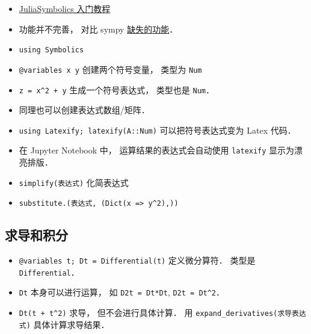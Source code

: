 
\begin{itemize}
\item \href{https://symbolics.juliasymbolics.org/dev/tutorials/symbolic_functions/}{JuliaSymbolics 入门教程}
\item 功能并不完善， 对比 sympy \href{https://github.com/JuliaSymbolics/Symbolics.jl/issues/59}{缺失的功能}．
\item \verb|using Symbolics|
\item \verb|@variables x y| 创建两个符号变量， 类型为 \verb|Num|
\item \verb|z = x^2 + y| 生成一个符号表达式， 类型也是 \verb|Num|．
\item 同理也可以创建表达式数组/矩阵．
\item \verb|using Latexify; latexify(A::Num)| 可以把符号表达式变为 Latex 代码．
\item 在 Jupyter Notebook 中， 运算结果的表达式会自动使用 \verb|latexify| 显示为漂亮排版．
\item \verb|simplify(表达式)| 化简表达式
\item \verb|substitute.(表达式, (Dict(x => y^2),))|
\end{itemize}


\subsection{求导和积分}
\begin{itemize}
\item \verb|@variables t; Dt = Differential(t)| 定义微分算符． 类型是 \verb|Differential|．
\item \verb|Dt| 本身可以进行运算， 如 \verb|D2t = Dt*Dt|, \verb|D2t = Dt^2|．
\item \verb|Dt(t + t^2)| 求导， 但不会进行具体计算． 用 \verb|expand_derivatives(求导表达式)| 具体计算求导结果．
\end{itemize}
